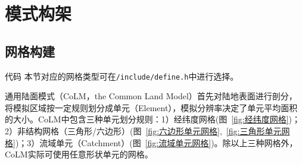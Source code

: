 \chapter{模式构架}\label{模式构架}

\section{网格构建}\label{网格构建}
\begin{mymdframed}{代码}
  本节对应的网格类型可在\texttt{/include/define.h}中进行选择。
\end{mymdframed}

通用陆面模式（CoLM，the Common Land Model）首先对陆地表面进行剖分，将模拟区域按一定规则划分成单元（Element），模拟分辨率决定了单元平均面积的大小。CoLM中包含三种单元划分规则：1）经纬度网格(图~\ref{fig:经纬度网格})；2）非结构网格（三角形/六边形）(图~\ref{fig:六边形单元网格},~\ref{fig:三角形单元网格})；3）流域单元（Catchment）(图~\ref{fig:流域单元网格})。除以上三种网格外，CoLM实际可使用任意形状单元的网格。


